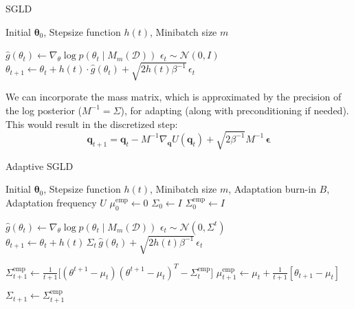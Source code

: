 \documentclass{article}
\begin{document}
    \begin{algorithm}
      \caption{SGLD}\label{alg:sgld}
      \begin{algorithmic}

      \Require Initial $\boldsymbol{\theta}_0$, Stepsize function $h(t)$, Minibatch size $m$

          \State $\hat{g}(\theta_t) \gets \nabla_\theta \log{p(\theta_t \mid M_m(\mathcal{D}))}$
          \State $\epsilon_t \sim \mathcal{N}(0, I)$
          \State $\theta_{t+1} \gets \theta_t + h(t) \cdot \hat{g}(\theta_t) + \sqrt{2 h(t) \beta^{-1}} \, \epsilon_t$
      \EndFor

      \end{algorithmic}
    \end{algorithm}

    We can incorporate the mass matrix, which is approximated by the precision of the log posterior ($M^{-1} = \Sigma$), for adapting (along with preconditioning if needed). This would result in the discretized step: 
    \begin{equation}
      \mathbf{q}_{t+1} = \mathbf{q}_t - M^{-1} \nabla_{\mathbf{q}} U(\mathbf{q}_t) + \sqrt{2 \beta^{-1}} M^{-1} \, \boldsymbol{\epsilon}
    \end{equation}

    \begin{algorithm}
      \caption{Adaptive SGLD}\label{alg:adaptive_sgld}
      \begin{algorithmic}

      \Require Initial $\boldsymbol{\theta}_0$, Stepsize function $h(t)$, Minibatch size $m$, Adaptation burn-in $B$, Adaptation frequency $U$
      \State $\mu_0^{\mathrm{emp}} \gets 0$
      \State $\Sigma_0 \gets I$
      \State $\Sigma_0^{\mathrm{emp}} \gets I$

          \State $\hat{g}(\theta_t) \gets \nabla_\theta \log{p(\theta_t \mid M_m(\mathcal{D}))}$
          \State $\epsilon_t \sim \mathcal{N}(0, \Sigma^t)$
          \State $\theta_{t+1} \gets \theta_t + h(t) \, \Sigma_t \, \hat{g}(\theta_t) + \sqrt{2 h(t) \beta^{-1}} \, \epsilon_t$
          
          \State $\Sigma^\mathrm{emp}_{t+1} \gets \frac{1}{t+1} \big[(\theta^{t+1} - \mu_t) (\theta^{t+1} - \mu_t)^T - \Sigma^\mathrm{emp}_t \big]$
          \State $\mu_{t+1}^\mathrm{emp} \gets \mu_t + \frac{1}{t+1} [ \theta_{t+1} - \mu_t ]$
          
              \State $\Sigma_{t+1} \gets \Sigma_{t+1}^{\mathrm{emp}}$
          \EndIf
      \EndFor

      \end{algorithmic}
    \end{algorithm}
\end{document}
